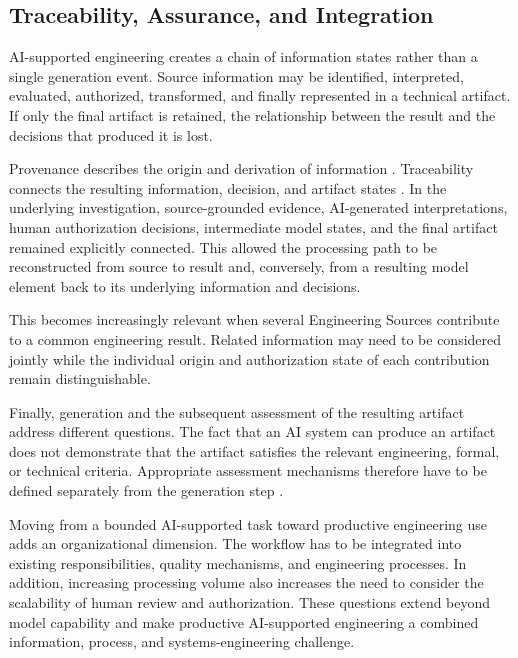 \subsection{Traceability, Assurance, and Integration}
\label{sec:challenge_assurance}

AI-supported engineering creates a chain of information states rather than a single
generation event. Source information may be identified, interpreted, evaluated, authorized,
transformed, and finally represented in a technical artifact. If only the final artifact is
retained, the relationship between the result and the decisions that produced it is lost.

Provenance describes the origin and derivation of information
\cite{MoreauMissier2013,Simmhan2005}. Traceability connects the resulting information,
decision, and artifact states \cite{ISO29148}. In the underlying investigation, source-grounded evidence,
AI-generated interpretations, human authorization decisions, intermediate model states,
and the final artifact remained explicitly connected. This allowed the processing path to
be reconstructed from source to result and, conversely, from a resulting model element back
to its underlying information and decisions.

This becomes increasingly relevant when several Engineering Sources contribute to a common
engineering result. Related information may need to be considered jointly while the
individual origin and authorization state of each contribution remain distinguishable.

Finally, generation and the subsequent assessment of the resulting artifact address
different questions. The fact that an AI system can produce an artifact does not demonstrate
that the artifact satisfies the relevant engineering, formal, or technical criteria.
Appropriate assessment mechanisms therefore have to be defined separately from the
generation step \cite{Topcu2025,Cibrian.2025,Stein2026}.

Moving from a bounded AI-supported task toward productive engineering use adds an
organizational dimension. The workflow has to be integrated into existing responsibilities,
quality mechanisms, and engineering processes. In addition, increasing processing volume
also increases the need to consider the scalability of human review and authorization.
These questions extend beyond model capability and make productive AI-supported engineering
a combined information, process, and systems-engineering challenge.
